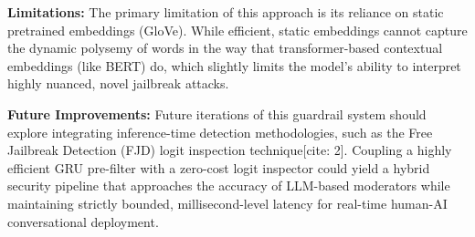 \documentclass[11pt]{article}
\begin{document}
\textbf{Limitations:} The primary limitation of this approach is its reliance on static pretrained embeddings (GloVe). While efficient, static embeddings cannot capture the dynamic polysemy of words in the way that transformer-based contextual embeddings (like BERT) do, which slightly limits the model's ability to interpret highly nuanced, novel jailbreak attacks.

\textbf{Future Improvements:} Future iterations of this guardrail system should explore integrating inference-time detection methodologies, such as the Free Jailbreak Detection (FJD) logit inspection technique[cite: 2]. Coupling a highly efficient GRU pre-filter with a zero-cost logit inspector could yield a hybrid security pipeline that approaches the accuracy of LLM-based moderators while maintaining strictly bounded, millisecond-level latency for real-time human-AI conversational deployment.
\end{document}
